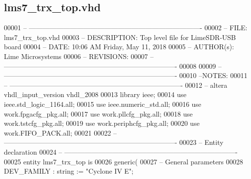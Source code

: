 \subsection{lms7\+\_\+trx\+\_\+top.\+vhd}
\label{lms7__trx__top_8vhd_source}

\begin{DoxyCode}
00001 \textcolor{keyword}{-- ----------------------------------------------------------------------------}
00002 \textcolor{keyword}{-- FILE:          lms7\_trx\_top.vhd}
00003 \textcolor{keyword}{-- DESCRIPTION:   Top level file for LimeSDR-USB board}
00004 \textcolor{keyword}{-- DATE:          10:06 AM Friday, May 11, 2018}
00005 \textcolor{keyword}{-- AUTHOR(s):     Lime Microsystems}
00006 \textcolor{keyword}{-- REVISIONS:}
00007 \textcolor{keyword}{-- ----------------------------------------------------------------------------}
00008 
00009 \textcolor{keyword}{-- ----------------------------------------------------------------------------}
00010 \textcolor{keyword}{--NOTES:}
00011 \textcolor{keyword}{-- ----------------------------------------------------------------------------}
00012 \textcolor{keyword}{-- altera vhdl\_input\_version vhdl\_2008}
00013 \textcolor{vhdlkeyword}{library }\textcolor{keywordflow}{ieee};
00014 \textcolor{vhdlkeyword}{use }ieee.std\_logic\_1164.\textcolor{keywordflow}{all};
00015 \textcolor{vhdlkeyword}{use }ieee.numeric\_std.\textcolor{keywordflow}{all};
00016 \textcolor{vhdlkeyword}{use }work.fpgacfg_pkg.\textcolor{keywordflow}{all};
00017 \textcolor{vhdlkeyword}{use }work.pllcfg_pkg.\textcolor{keywordflow}{all};
00018 \textcolor{vhdlkeyword}{use }work.tstcfg_pkg.\textcolor{keywordflow}{all};
00019 \textcolor{vhdlkeyword}{use }work.periphcfg_pkg.\textcolor{keywordflow}{all};
00020 \textcolor{vhdlkeyword}{use }work.FIFO_PACK.\textcolor{keywordflow}{all};
00021 
00022 \textcolor{keyword}{-- ----------------------------------------------------------------------------}
00023 \textcolor{keyword}{-- Entity declaration}
00024 \textcolor{keyword}{-- ----------------------------------------------------------------------------}
00025 \textcolor{keywordflow}{entity }lms7_trx_top \textcolor{keywordflow}{is}
00026    \textcolor{keywordflow}{generic}\textcolor{vhdlchar}{(}
00027 \textcolor{keyword}{      -- General parameters}
00028       \textcolor{vhdlchar}{DEV_FAMILY}              \textcolor{vhdlchar}{:} \textcolor{comment}{string} \textcolor{vhdlchar}{:=} \textcolor{keyword}{"Cyclone IV E"};

\end{DoxyCode}

